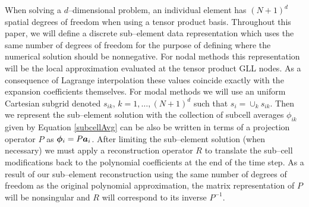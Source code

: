 \documentclass{ametsoc}
\begin{document}
When solving a $d$--dimensional problem, an individual element has $(N+1)^d$ spatial degrees of freedom when using a tensor product basis. Throughout this paper, we will define a discrete sub--element data representation which uses the same number of degrees of freedom for the purpose of defining where the numerical solution should be nonnegative. For nodal methods this representation will be the local approximation evaluated at the tensor product GLL nodes. As a consequence of Lagrange interpolation these values coincide exactly with the expansion coefficients themselves. For modal methods we will use an uniform Cartesian subgrid denoted $s_{ik}$, $k=1,\dots,(N+1)^d$ such that $s_i = \cup_{k} s_{ik}$. Then we represent the sub--element solution with the collection of subcell averages $\phi_{ik}$ given by
Equation \eqref{subcellAvg} can be also be written in terms of a projection operator $P$ as $\boldsymbol{\phi}_i = P \boldsymbol{a}_i$. After limiting the sub--element solution (when necessary) we must apply a reconstruction operator $R$ to translate the sub--cell modifications back to the polynomial coefficients at the end of the time step. As a result of our sub--element reconstruction using the same number of degrees of freedom as the original polynomial approximation, the matrix representation of $P$ will be nonsingular and $R$ will correspond to its inverse $P^{-1}$. 
\end{document}
